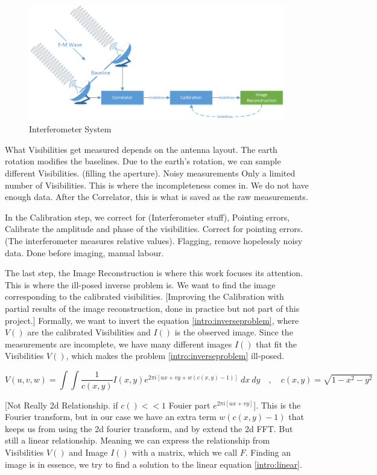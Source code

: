 \begin{figure}[h]
	\centering
	\includegraphics[width=0.80\linewidth]{./chapters/01.intro/system.png}
	\caption{Interferometer System}
	\label{intro:system}
\end{figure}

What Visibilities get measured depends on the antenna layout. The earth rotation modifies the baselines. Due to the earth's rotation, we can sample different Visibilities. (filling the aperture).
Noisy measurements
Only a limited number of Visibilities. This is where the incompleteness comes in. We do not have enough data.
After the Correlator, this is what is saved as the raw measurements.

In the Calibration step, we correct for (Interferometer stuff), Pointing errors, Calibrate the amplitude and phase of the visibilities. Correct for pointing errors. (The interferometer measures relative values). Flagging, remove hopelessly noisy data.
Done before imaging, manual labour.

The last step, the Image Reconstruction is where this work focuses its attention. This is where the ill-posed inverse problem is. We want to find the image corresponding to the calibrated visibilities. 
[Improving the Calibration with partial results of the image reconstruction, done in practice but not part of this project.]
Formally, we want to invert the equation \eqref{intro:inverseproblem}, where $V()$ are the calibrated Visibilities and $I()$ is the observed image. Since the measurements are incomplete, we have many different images $I()$ that fit the Visibilities $V()$, which makes the problem \eqref{intro:inverseproblem} ill-posed.

\begin{equation}\label{intro:inverseproblem}
V(u, v, w) = \int\int \frac{1}{c(x, y)} I(x, y) e^{2 \pi i [ux+vy+ w(c(x, y) - 1)]} \: dx \: dy \quad, \quad c(x,y) = \sqrt{1 - x^2 - y ^2}
\end{equation}

[Not Really 2d Relationship. if $c() << 1$ Fouier part $e^{2 \pi i [ux+vy]}$]. This is the Fourier transform, but in our case we have an extra term $w(c(x, y) - 1)$ that keeps us from using the 2d fourier transform, and by extend the 2d FFT.
But still a linear relationship. Meaning we can express the relationship from Visibilities $V()$ and Image $I()$ with a matrix, which we call $F$. Finding an image is in essence, we try to find a solution to the linear equation \eqref{intro:linear}.

